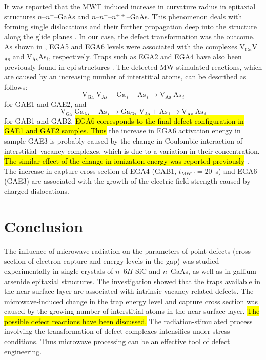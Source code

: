 \documentclass[10pt]{iopart}
\begin{document}
It was reported \cite{BoltovetsEn,Konakova2012FTPEn} that
the MWT induced increase in curvature radius in epitaxial
structures $n$--$n^+$--GaAs and $n$--$n^+$--$n^{++}$--GaAs.
This phenomenon deals with forming single dislocations and
their further propagation deep into the structure along the glide planes \cite{BoltovetsEn,Konakova2012FTPEn}.
In our case, the defect transformation was the outcome.
As shown in , EGA5 and EGA6 levels were associated with the complexes   V$_\mathrm{Ga}$V$_\mathrm{As}$  and V$_\mathrm{As}$As$_i$, respectively.
Traps such as EGA2 and EGA4 have also been previously found in epi-structures \cite{Yousefi1995,Mircea1975,Bourgoin:GaAs,ASHBY:GaAs,Fang:EL6,Lefevre1977,KolFTP1989En}.
The detected MW-stimulated reactions, which are caused by an increasing number of interstitial atoms, can be described as follows: \begin{equation*}
  \mathrm{V}_\mathrm{Ga}\;\mathrm{V}_\mathrm{As}+\mathrm{Ga}_{\,i}+\mathrm{As}_{\,i} \rightarrow \mathrm{V}_\mathrm{As}\;\mathrm{As}_{\,i}
\end{equation*}
for GAE1 and GAE2, and
\begin{equation*}
  \mathrm{V}_\mathrm{Ga}\;\mathrm{Ga}_\mathrm{As}+\mathrm{As}_{\,i} \rightarrow
  \mathrm{Ga}_\mathrm{Ga}\;\mathrm{V}_\mathrm{As}+\mathrm{As}_{\,i} \rightarrow
  \mathrm{V}_\mathrm{As}\;\mathrm{As}_{\,i}
\end{equation*}
for GAB1 and GAB2.
\hl{EGA6 corresponds to the final defect configuration in GAE1 and GAE2 samples.
Thus} the increase in EGA6 activation energy in sample GAE3 is probably caused by the change in
Coulombic interaction of interstitial--vacancy complexes,
which is due to a variation in their concentration.
\hl{The similar effect of the change in ionization energy
was reported previously} \cite{Stellmacher}.
The increase in capture cross section of EGA4 (GAB1, $t_\mathrm{MWT}=20$~s)
and EGA6 (GAE3) are associated with the growth of the electric field strength caused by charged dislocations.


\section{Conclusion}
The influence of microwave radiation on the parameters of point defects (cross section of electron capture and energy levels in the gap)
was studied experimentally  in single crystals of $n$–6$H$-SiC and  $n$–GaAs, as well as in gallium arsenide epitaxial structures.
The investigation showed that the traps available in the near-surface layer are associated with intrinsic
vacancy-related defects.
The microwave-induced change in the trap energy level and capture cross section
was caused by the growing number of interstitial atoms in the near-surface layer.
\hl{The possible defect reactions have been discussed.}
The radiation-stimulated process involving the transformation of defect complexes intensifies under stress conditions.
Thus microwave processing can be an effective tool of defect engineering.
\end{document}
